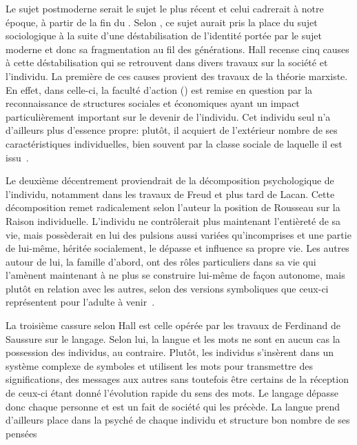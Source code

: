 Le sujet postmoderne serait le sujet le plus récent et celui cadrerait à notre époque, à partir de la fin du . 
Selon \citeauthor{Hall1996a}, ce sujet aurait pris la place du sujet sociologique à la suite d'une déstabilisation de l'identité portée par le sujet moderne et donc sa fragmentation au fil des générations. 
Hall recense cinq causes à cette déstabilisation qui se retrouvent dans divers travaux sur la société et l'individu. 
La première de ces causes provient des travaux de la théorie marxiste. 
En effet, dans celle-ci, la faculté d'action () est remise en question par la reconnaissance de structures sociales et économiques ayant un impact particulièrement important sur le devenir de l'individu. 
Cet individu seul n'a d'ailleurs plus d'essence propre: plutôt, il acquiert de l'extérieur nombre de ses caractéristiques individuelles, bien souvent par la classe sociale de laquelle il est issu~\citeyearpar[606]{Hall1996a}.

Le deuxième décentrement proviendrait de la décomposition psychologique de l'individu, notamment dans les travaux de Freud et plus tard de Lacan. 
Cette décomposition remet radicalement selon l'auteur la position de Rousseau sur la Raison individuelle. 
L'individu ne contrôlerait plus maintenant l'entièreté de sa vie, mais possèderait en lui des pulsions aussi variées qu'incomprises et une partie de lui-même, héritée socialement, le dépasse et influence sa propre vie. 
Les autres autour de lui, la famille d'abord, ont des rôles particuliers dans sa vie qui l'amènent maintenant à ne plus se construire lui-même de façon autonome, mais plutôt en relation avec les autres, selon des versions symboliques que ceux-ci représentent pour l'adulte à venir~\citeyearpar[ 607--608]{Hall1996a}.

La troisième cassure selon Hall est celle opérée par les travaux de Ferdinand de Saussure sur le langage. 
Selon lui, la langue et les mots ne sont en aucun cas la possession des individus, au contraire. 
Plutôt, les individus s'insèrent dans un système complexe de symboles et utilisent les mots pour transmettre des significations, des messages aux autres sans toutefois être certains de la réception de ceux-ci étant donné l'évolution rapide du sens des mots. 
Le langage dépasse donc chaque personne et est un fait de société qui les précède. 
La langue prend d'ailleurs place dans la psyché de chaque individu et structure bon nombre de ses pensées~\citeyearpar[608--609]{Hall1996a}

